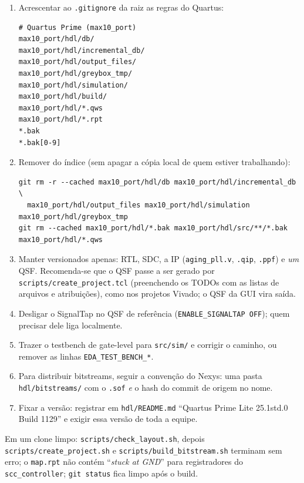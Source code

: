 \documentclass[11pt,a4paper]{article}
\newcommand{\campo}[1]{\vspace{5pt}\noindent{\bfseries\color{lescgray}#1}\par\vspace{1pt}}
\newcommand{\file}[1]{\texttt{\small #1}}
\begin{document}
\campo{Como corrigir}
\begin{enumerate}
  \item Acrescentar ao \file{.gitignore} da raiz as regras do Quartus:
\begin{lstlisting}[style=sh]
# Quartus Prime (max10_port)
max10_port/hdl/db/
max10_port/hdl/incremental_db/
max10_port/hdl/output_files/
max10_port/hdl/greybox_tmp/
max10_port/hdl/simulation/
max10_port/hdl/build/
max10_port/hdl/*.qws
max10_port/hdl/*.rpt
*.bak
*.bak[0-9]
\end{lstlisting}
  \item Remover do índice (sem apagar a cópia local de quem estiver trabalhando):
\begin{lstlisting}[style=sh]
git rm -r --cached max10_port/hdl/db max10_port/hdl/incremental_db \
  max10_port/hdl/output_files max10_port/hdl/simulation max10_port/hdl/greybox_tmp
git rm --cached max10_port/hdl/*.bak max10_port/hdl/src/**/*.bak max10_port/hdl/*.qws
\end{lstlisting}
  \item Manter versionados apenas: RTL, SDC, a IP (\file{aging\_pll.v}, \file{.qip}, \file{.ppf})
        e \emph{um} QSF. Recomenda-se que o QSF passe a ser gerado por
        \file{scripts/create\_project.tcl} (preenchendo os TODOs com as listas de arquivos e
        atribuições), como nos projetos Vivado; o QSF da GUI vira saída.
  \item Desligar o SignalTap no QSF de referência (\texttt{ENABLE\_SIGNALTAP OFF}); quem precisar
        dele liga localmente.
  \item Trazer o testbench de gate-level para \file{src/sim/} e corrigir o caminho, ou remover
        as linhas \texttt{EDA\_TEST\_BENCH\_*}.
  \item Para distribuir bitstreams, seguir a convenção do Nexys: uma pasta
        \file{hdl/bitstreams/} com o \texttt{.sof} \emph{e} o hash do commit de origem no nome.
  \item Fixar a versão: registrar em \file{hdl/README.md} ``Quartus Prime Lite 25.1std.0
        Build 1129'' e exigir essa versão de toda a equipe.
\end{enumerate}

\campo{Como verificar}
Em um clone limpo: \texttt{scripts/check\_layout.sh}, depois \texttt{scripts/create\_project.sh}
e \texttt{scripts/build\_bitstream.sh} terminam sem erro; o \file{map.rpt} não contém
``\emph{stuck at GND}'' para registradores do \texttt{scc\_controller}; \texttt{git status}
fica limpo após o build.
\end{document}
